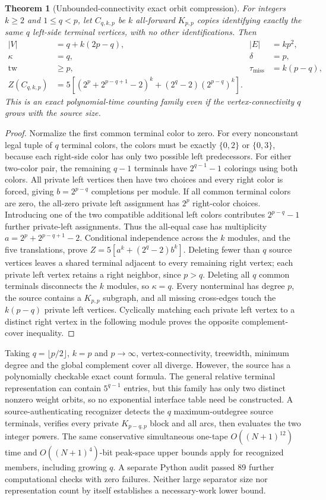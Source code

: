 \documentclass[11pt]{article}
\newtheorem{theorem}{Theorem}
\begin{document}
\begin{theorem}[Unbounded-connectivity exact orbit compression]
For integers $k\ge2$ and $1\le q<p$, let $C_{q,k,p}$ be
$k$ all-forward $K_{p,p}$ copies identifying exactly the same
$q$ left-side terminal vertices, with no other identifications.
Then
\[
\begin{aligned}
|V|&=q+k(2p-q),& |E|&=kp^2,\\
\kappa&=q,&\delta&=p,\\
\operatorname{tw}&\ge p,&
\tau_{\mathrm{miss}}&=k(p-q),\\
Z(C_{q,k,p})&=5\left[
(2^p+2^{p-q+1}-2)^k+
(2^q-2)(2^{p-q})^k
\right].
\end{aligned}
\]
This is an exact polynomial-time counting family even if the
vertex-connectivity $q$ grows with the source size.
\end{theorem}
\begin{proof}
Normalize the first common terminal color to zero. For every
nonconstant legal tuple of $q$ terminal colors, the colors
must be exactly $\{0,2\}$ or $\{0,3\}$, because each right-side
color has only two possible left predecessors. For either
two-color pair, the remaining $q-1$ terminals have
$2^{q-1}-1$ colorings using both colors. All private left
vertices then have two choices and every right color is
forced, giving $b=2^{p-q}$ completions per module.
If all common terminal colors are zero, the all-zero
private left assignment has $2^p$ right-color choices.
Introducing one of the two compatible additional left
colors contributes $2^{p-q}-1$ further private-left
assignments. Thus the all-equal case has multiplicity
$a=2^p+2^{p-q+1}-2$. Conditional independence across
the $k$ modules, and the five translations, prove
$Z=5[a^k+(2^q-2)b^k]$.
Deleting fewer than $q$ source vertices leaves a shared
terminal adjacent to every remaining right vertex; each
private left vertex retains a right neighbor, since $p>q$.
Deleting all $q$ common terminals disconnects the
$k$ modules, so $\kappa=q$. Every nonterminal has
degree $p$, the source contains a $K_{p,p}$ subgraph,
and all missing cross-edges touch the $k(p-q)$ private
left vertices. Cyclically matching each private left
vertex to a distinct right vertex in the following
module proves the opposite complement-cover inequality.
\end{proof}

Taking $q=\lfloor p/2\rfloor$, $k=p$ and $p\to\infty$,
vertex-connectivity, treewidth, minimum degree and the
global complement cover all diverge. However, the source
has a polynomially checkable exact count formula.
The general relative terminal representation can contain
$5^{q-1}$ entries, but this family has only two distinct
nonzero weight orbits, so no exponential interface table
need be constructed. A source-authenticating recognizer
detects the $q$ maximum-outdegree source terminals,
verifies every private $K_{p-q,p}$ block and all arcs,
then evaluates the two integer powers. The same
conservative simultaneous one-tape
$O((N+1)^{12})$ time and $O((N+1)^4)$-bit peak-space
upper bounds apply for recognized members, including
growing $q$. A separate Python audit passed 89 further
computational checks with zero failures.
Neither large separator size nor representation count
by itself establishes a necessary-work lower bound.
\end{document}
